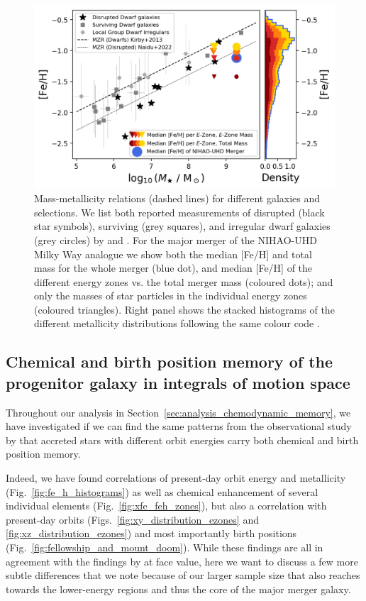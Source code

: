 \documentclass[fleqn,usenatbib]{mnras}
\begin{document}
\begin{figure}
    \centering
    \includegraphics[width=\columnwidth]{figures/mzr_different_selections.png}
    \caption{Mass-metallicity relations (dashed lines) for different galaxies and selections. We list both reported measurements of disrupted (black star symbols), surviving  (grey squares), and irregular dwarf galaxies (grey circles) by \citet{Kirby2013} and \citet{Naidu2022b}. For the major merger of the NIHAO-UHD Milky Way analogue we show both the median [Fe/H] and total mass for the whole merger (blue dot), and median [Fe/H] of the different energy zones vs. the total merger mass (coloured dots); and only the masses of star particles in the individual energy zones (coloured triangles). Right panel shows the stacked histograms of the different metallicity distributions following the same colour code \href{https://github.com/svenbuder/gse_nihaouhd/tree/main/figures}{\faGithub}.}
    \label{fig:mzr_different_selections}
\end{figure}

\subsection{Chemical and birth position memory of the progenitor galaxy in integrals of motion space} \label{sec:discussion_memory}

Throughout our analysis in Section~\ref{sec:analysis_chemodynamic_memory}, we have investigated if we can find the same patterns from the observational study by \citet{Skuladottir2025} that accreted stars with different orbit energies carry both chemical and birth position memory.

Indeed, we have found correlations of present-day orbit energy and metallicity (Fig.~\ref{fig:fe_h_histograms}) as well as chemical enhancement of several individual elements (Fig.~\ref{fig:xfe_feh_zones}), but also a correlation with present-day orbits (Figs.~\ref{fig:xy_distribution_ezones} and \ref{fig:xz_distribution_ezones}) and most importantly birth positions (Fig.~\ref{fig:fellowship_and_mount_doom}). While these findings are all in agreement with the findings by \citet{Skuladottir2025} at face value, here we want to discuss a few more subtle differences that we note because of our larger sample size that also reaches towards the lower-energy regions and thus the core of the major merger galaxy.
\end{document}
